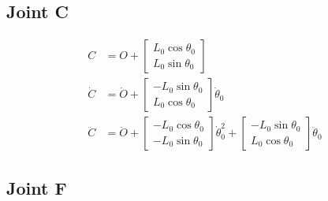 \documentclass[letterpaper]{article}
\begin{document}
\subsection{Joint C}
 
\begin{align}
	C &= O + \begin{bmatrix} L_0 \cos \theta_0\\ L_0 \sin \theta_0 \end{bmatrix} \\
	\dot{C} &= \dot{O} + \begin{bmatrix} -L_0 \sin \theta_0 \\ L_0 \cos \theta_0 \end{bmatrix} \dot{\theta}_0 \\
	\ddot{C} &= \ddot{O} + \begin{bmatrix} -L_0 \cos \theta_0 \\ - L_0 \sin \theta_0 \end{bmatrix} \dot{\theta}_0^2 + \begin{bmatrix} -L_0 \sin \theta_0 \\ L_0 \cos \theta_0 \end{bmatrix} \ddot{\theta}_0
\end{align}

\subsection{Joint F}
\end{document}

